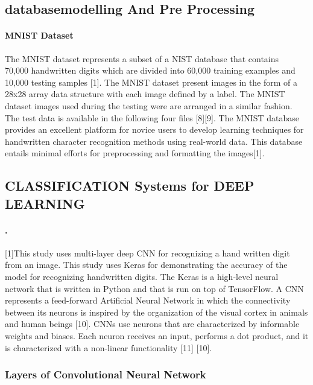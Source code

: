 \documentclass{article}
\begin{document}
\subsection{databasemodelling And Pre Processing}


\paragraph{MNIST Dataset}

The MNIST dataset represents a subset of a NIST database that contains ~ 70,000 handwritten digits which are divided into 60,000 training examples and 10,000 testing samples [1]. The MNIST dataset present images in the  form of a 28x28 array data structure with each image defined by a label. The MNIST dataset images used during the testing were are arranged in a similar fashion. The test data is available in the following four files [8][9]. The MNIST database provides an excellent platform for novice users to develop learning techniques for handwritten character recognition methods using real-world data. This database entails minimal efforts for preprocessing and formatting the images[1].
 
\subsection{CLASSIFICATION Systems for DEEP LEARNING}

\paragraph{.}
[1]This study uses multi-layer deep CNN for recognizing a hand written digit from an image. This study uses Keras for demonstrating the accuracy of the model for recognizing handwritten digits. The Keras is a high-level neural network that is written in Python and that is run on top of TensorFlow. A CNN represents a feed-forward Artificial Neural Network in which the connectivity between its neurons is inspired by the organization of the visual cortex in animals and human beings [10]. CNNs use neurons that are characterized by informable weights and biases. Each neuron receives an input, performs a dot product, and it is characterized with a non-linear functionality [11] [10].

\subsubsection{Layers of Convolutional Neural Network}
\end{document}
